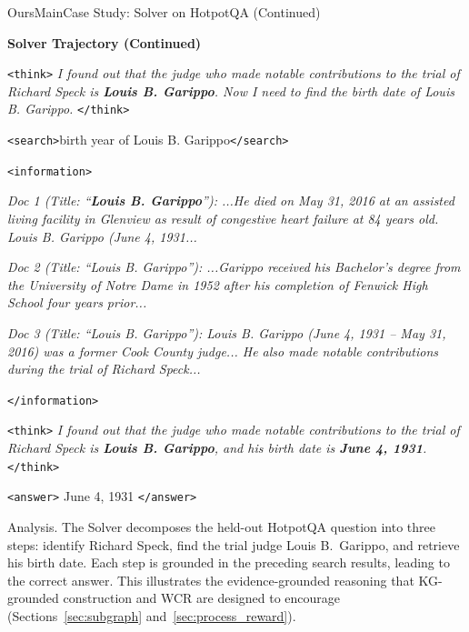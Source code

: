 \begin{casepagebox}{OursMain}{Case Study: Solver on HotpotQA (Continued)}
\noindent\colorbox{OursMain!20}{\parbox{\dimexpr\linewidth-2\fboxsep}{\textcolor{OursMain}{\textbf{Solver Trajectory (Continued)}}}}

\vspace{3mm}

\begin{thinkpanel}
\textcolor{TagThink}{\texttt{<think>}} \textit{I found out that the judge who made notable contributions to the trial of Richard Speck is \colorbox{yellow!30}{\textbf{Louis B. Garippo}}. Now I need to find the birth date of Louis B. Garippo.} \textcolor{TagThink}{\texttt{</think>}}
\end{thinkpanel}

\textcolor{TagSearch}{\texttt{<search>}}birth year of Louis B. Garippo\textcolor{TagSearch}{\texttt{</search>}}

\textcolor{TagInfo}{\texttt{<information>}}

\textit{Doc 1 (Title: ``\colorbox{yellow!30}{\textbf{Louis B. Garippo}}''): ...He died on May 31, 2016 at an assisted living facility in Glenview as result of congestive heart failure at 84 years old. Louis B. Garippo (\colorbox{yellow!30}{June 4, 1931}...}

\textit{Doc 2 (Title: ``Louis B. Garippo''): ...Garippo received his Bachelor's degree from the University of Notre Dame in 1952 after his completion of Fenwick High School four years prior...}

\textit{Doc 3 (Title: ``Louis B. Garippo''): Louis B. Garippo (June 4, 1931 -- May 31, 2016) was a former Cook County judge... He also made notable contributions during the trial of Richard Speck...}

\textcolor{TagInfo}{\texttt{</information>}}
\vspace{3mm}

\begin{thinkpanel}
\textcolor{TagThink}{\texttt{<think>}} \textit{I found out that the judge who made notable contributions to the trial of Richard Speck is \colorbox{yellow!30}{\textbf{Louis B. Garippo}}, and his birth date is \colorbox{yellow!30}{\textbf{June 4, 1931}}.} \textcolor{TagThink}{\texttt{</think>}}
\end{thinkpanel}

\vspace{2mm}
\textcolor{TagAnswer}{\texttt{<answer>}} June 4, 1931 \textcolor{TagAnswer}{\texttt{</answer>}}

\end{casepagebox}

\noindent Analysis.
The Solver decomposes the held-out HotpotQA question into three steps: identify Richard Speck, find the trial judge Louis B.\ Garippo, and retrieve his birth date.
Each step is grounded in the preceding search results, leading to the correct answer.
This illustrates the evidence-grounded reasoning that KG-grounded construction and WCR are designed to encourage (Sections~\ref{sec:subgraph} and~\ref{sec:process_reward}).
